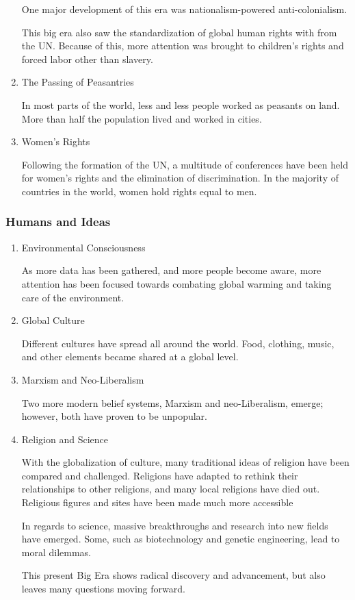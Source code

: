 \documentclass[11pt]{article}
\begin{document}
\begin{enumerate}
One major development of this era was nationalism-powered anti-colonialism.

This big era also saw the standardization of global human rights with from the UN. Because of this, more attention was brought to children's rights and forced labor other than slavery.

\item The Passing of Peasantries
\label{sec:org86dbb49}

In most parts of the world, less and less people worked as peasants on land. More than half the population lived and worked in cities.

\item Women's Rights
\label{sec:org12de14f}

Following the formation of the UN, a multitude of conferences have been held for women's rights and the elimination of discrimination. In the majority of countries in the world, women hold rights equal to men.
\end{enumerate}

\subsubsection{Humans and Ideas}
\label{sec:org6883a4f}
\begin{enumerate}
\item Environmental Consciousness
\label{sec:orge7139cb}

As more data has been gathered, and more people become aware, more attention has been focused towards combating global warming and taking care of the environment.

\item Global Culture
\label{sec:org9d48a00}

Different cultures have spread all around the world. Food, clothing, music, and other elements became shared at a global level.

\item Marxism and Neo-Liberalism
\label{sec:orgfb14f7f}

Two more modern belief systems, Marxism and neo-Liberalism, emerge; however, both have proven to be unpopular.

\item Religion and Science
\label{sec:orga9bad77}

With the globalization of culture, many traditional ideas of religion have been compared and challenged. Religions have adapted to rethink their relationships to other religions, and many local religions have died out. Religious figures and sites have been made much more accessible

In regards to science, massive breakthroughs and research into new fields have emerged. Some, such as biotechnology and genetic engineering, lead to moral dilemmas.

This present Big Era shows radical discovery and advancement, but also leaves many questions moving forward.
\end{enumerate}
\end{document}
